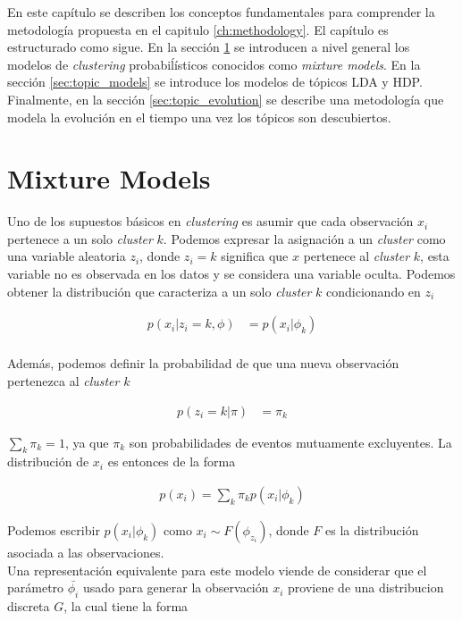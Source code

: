 En este capítulo se describen los conceptos fundamentales para comprender la metodología propuesta en el capitulo \ref{ch:methodology}. El capítulo es estructurado como sigue. En la sección \ref{sec:mixture_models} se introducen a nivel general los modelos de \textit{clustering} probabiĺísticos conocidos como \textit{mixture models}. En la sección \ref{sec:topic_models} se introduce los modelos de tópicos LDA y HDP. Finalmente, en la sección \ref{sec:topic_evolution} se describe una metodología que modela la evolución en el tiempo una vez los tópicos son descubiertos. 

\section{Mixture Models}
\label{sec:mixture_models}

Uno de los supuestos básicos en \textit{clustering} es asumir que cada observación $x_{i}$ pertenece a un solo \textit{cluster} $k$. Podemos expresar la asignación a un \textit{cluster} como una variable aleatoria $z_{i}$, donde $z_{i}=k$ significa que $x$ pertenece al \textit{cluster} $k$, esta variable no es observada en los datos y se considera una variable oculta. Podemos obtener la distribución que caracteriza a un solo \textit{cluster} $k$ condicionando en $z_{i}$

\begin{align}
    p(x_{i}|z_{i}=k, \phi) & = p(x_{i}|\phi_{k})\\
\end{align}

Además, podemos definir la probabilidad de que una nueva observación pertenezca al \textit{cluster} $k$ 

\begin{align}
    p(z_{i}=k|\pi) & = \pi_{k}
\end{align}

$\sum_{k}\pi_{k} = 1$, ya que $\pi_{k}$ son probabilidades de eventos mutuamente excluyentes. La distribución de $x_{i}$ es entonces de la forma

\begin{align}
    p(x_{i}) = \sum_{k}\pi_{k}p(x_{i}|\phi_{k})
\end{align}

Podemos escribir $p(x_{i}|\phi_{k})$ como $x_{i} \sim F(\phi_{z_{i}})$, donde $F$ es la distribución asociada a las observaciones. \\

Una representación equivalente para este modelo viende de considerar que el parámetro $\bar{\phi_{i}}$ usado para generar la observación $x_{i}$ proviene de una distribucion discreta $G$, la cual tiene la forma

